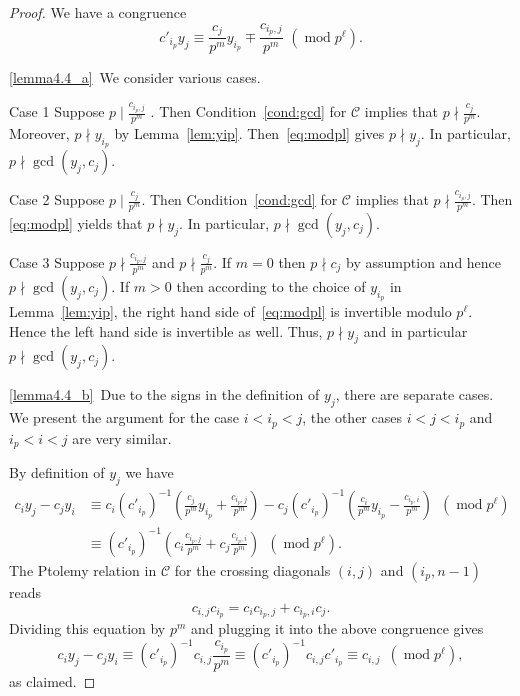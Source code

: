 \documentclass[ALCO,ThmDefs,Unicode,epreuves,published]{cedram}
\numberwithin{equation}{section}
\DeclareMathOperator{\md}{mod}
\begin{document}
\begin{proof}
We have a congruence 
\begin{equation} \label{eq:modpl}
 c'_{i_p} y_j \equiv \frac{c_j}{p^m} y_{i_p} \mp \frac{c_{i_p,j}}{p^m}\,\,
(\md p^{\ell}).
\end{equation}

\ref{lemma4.4_a}~We consider various cases. 

\begin{enonce*}[remark]{Case 1} Suppose $p\mid \frac{c_{i_p,j}}{p^m}$ .
Then Condition~\eqref{cond:gcd} for $\mathcal{C}$ implies that 
$p\nmid \frac{c_{j}}{p^m}$. Moreover, $p\nmid y_{i_p}$ by Lemma~\ref{lem:yip}.
Then~\eqref{eq:modpl} gives $p\nmid y_j$. In particular, $p\nmid \gcd(y_j,c_j)$.
\end{enonce*}

\begin{enonce*}[remark]{Case 2} Suppose $p\mid \frac{c_{j}}{p^m}$. 
Then Condition~\eqref{cond:gcd} for $\mathcal{C}$ implies that 
$p\nmid \frac{c_{i_p,j}}{p^m}$. Then 
\eqref{eq:modpl} yields
that $p\nmid y_j$. In particular, $p\nmid \gcd(y_j,c_j)$. 
\end{enonce*}

\begin{enonce*}[remark]{Case 3} Suppose $p\nmid \frac{c_{i_p,j}}{p^m}$ and $p\nmid \frac{c_{j}}{p^m}$.
If $m=0$ then $p\nmid c_j$ by assumption and hence
$p\nmid \gcd(y_j,c_j)$. If $m>0$ then
according to the choice of $y_{i_p}$ in 
Lemma~\ref{lem:yip}, the right hand side of~\eqref{eq:modpl} is 
invertible modulo $p^{\ell}$. Hence the left hand side is invertible as well.
Thus, $p\nmid y_j$ and in particular $p\nmid \gcd(y_j,c_j)$. 
\end{enonce*}


\ref{lemma4.4_b}~Due to the signs in the definition of $y_j$, 
there are separate cases. We present the argument for the case $i<i_p<j$, the other cases
$i<j<i_p$ and $i_p<i<j$ are very similar. 

By definition of $y_j$ we have
\begin{align*}
c_i y_j - c_j y_i & \equiv  c_i (c'_{i_p})^{-1} \left(\frac{c_j}{p^m} y_{i_p} + \frac{c_{i_p,j}}{p^m}\right)
- c_j (c'_{i_p})^{-1}\left( \frac{c_i}{p^m} y_{i_p} - \frac{c_{i_p,i}}{p^m}\right)\,\,\,
(\md p^{\ell}) \\
 & \equiv  (c'_{i_p})^{-1} \left( c_i \frac{c_{i_p,j}}{p^m} + c_j \frac{c_{i_p,i}}{p^m}\right)
 \,\,\,(\md p^{\ell}) .
\end{align*}
The Ptolemy relation in $\mathcal{C}$ for the crossing diagonals $(i,j)$ and $(i_p,n-1)$
reads 
\[
c_{i,j} c_{i_p} = c_i c_{i_p,j} + c_{i_p,i}c_j.
\]
Dividing this equation by $p^m$ and plugging it into the above congruence gives
\[
c_i y_j - c_j y_i \equiv (c'_{i_p})^{-1} c_{i,j} \frac{c_{i_p}}{p^m}
\equiv (c'_{i_p})^{-1} c_{i,j} c'_{i_p}
\equiv c_{i,j}\,\,\,(\md p^{\ell}),
\]
as claimed.
\end{proof}
\end{document}
